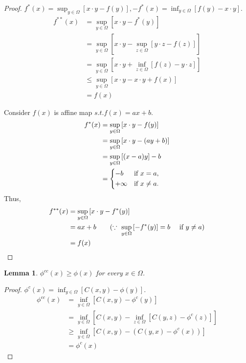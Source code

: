 \documentclass{jsarticle}
\newtheorem{lem}[thm]{Lemma}
\theoremstyle{definition}
\begin{document}
\begin{proof}
\begin{math}
f^{*}(x) = \displaystyle \sup_{y\in \Omega}{[x \cdot y - f(y)]}, 
- f^{*}(x) = \displaystyle \inf_{y\in \Omega}{[f(y) - x \cdot y]}. 
\end{math}
\begin{align*}
f^{**}(x) &= \displaystyle \sup_{y\in \Omega}{[x \cdot y - f^{*}(y)]} \\
          &= \displaystyle \sup_{y\in \Omega}{[x \cdot y - \displaystyle \sup_{z\in \Omega}{[y \cdot z - f(z)]}]} \\
          &= \displaystyle \sup_{y\in \Omega}{[x \cdot y + \displaystyle \inf_{z\in \Omega}{[f(z) - y \cdot z]}]} \\
          &\leq \displaystyle \sup_{y\in \Omega}{[x \cdot y - x \cdot y + f(x)]} \\
          &= f(x)
\end{align*}

Consider $f(x)$ is affine map $s. t.  f(x) = ax + b$.
\begin{align*}
f^{*}(x) &= \displaystyle \sup_{y\in \Omega}{[x \cdot y - f(y)]} \\
         &= \displaystyle \sup_{y\in \Omega}{[x \cdot y - (ay + b)]} \\
         &= \displaystyle \sup_{y\in \Omega}{[(x - a) y ]} - b \\
         &=\begin{cases*}
                   - b & if $x = a$, \\
                   + \infty & if $x \ne a$.
                   \end{cases*}
\end{align*}
Thus, 
\begin{align*}
f^{**}(x) &= \displaystyle \sup_{y\in \Omega}{[x \cdot y - f^{*}(y)]} \\
          &= ax + b \qquad ( \because \text{ $\displaystyle \sup_{y\in \Omega} {[-f^{*}(y)]} = b$ \quad if $y \ne a$)}\\
          &= f(x) 
\end{align*}

\end{proof}

\begin{lem}
$\phi^{cc}(x) \geq \phi(x)$ for every $x \in \Omega$.
\end{lem}

\begin{proof}

$\phi^{c}(x)=\displaystyle \inf_{y\in \Omega}{[C(x, y)-\phi(y)]}$. 
\begin{align*}
\phi^{cc}(x) &= \displaystyle \inf_{y\in \Omega}{[C(x, y)-\phi^c(y)]}\\ 
             &= \displaystyle \inf_{y\in \Omega}{[C(x, y)- \displaystyle \inf_{z\in \Omega}{[C(y, z)-\phi^c(z)]}]}\\
             &\geq \displaystyle \inf_{y\in \Omega}{[C(x, y)- (C(y, x)-\phi^c(x))]}\\
             &= \phi^c(x)
\end{align*}
\end{proof}
\end{document}
